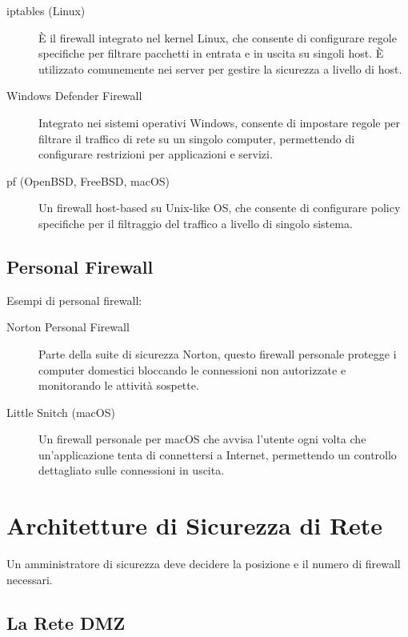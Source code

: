 \begin{description}
    \item[iptables (Linux)] È il firewall integrato nel kernel Linux, che consente di configurare regole specifiche per filtrare pacchetti in entrata e in uscita su singoli host. È utilizzato comunemente nei server per gestire la sicurezza a livello di host.
    
    \item[Windows Defender Firewall] Integrato nei sistemi operativi Windows, consente di impostare regole per filtrare il traffico di rete su un singolo computer, permettendo di configurare restrizioni per applicazioni e servizi.
    
    \item[pf (OpenBSD, FreeBSD, macOS)] Un firewall host-based su Unix-like OS, che consente di configurare policy specifiche per il filtraggio del traffico a livello di singolo sistema.
\end{description}

\subsection{Personal Firewall}

Esempi di personal firewall:

\begin{description}
    \item[Norton Personal Firewall] Parte della suite di sicurezza Norton, questo firewall personale protegge i computer domestici bloccando le connessioni non autorizzate e monitorando le attività sospette.
    
    \item[Little Snitch (macOS)] Un firewall personale per macOS che avvisa l'utente ogni volta che un'applicazione tenta di connettersi a Internet, permettendo un controllo dettagliato sulle connessioni in uscita.
\end{description}

\section{Architetture di Sicurezza di Rete}

Un amministratore di sicurezza deve decidere la posizione e il numero di firewall necessari.

\subsection{La Rete DMZ}

